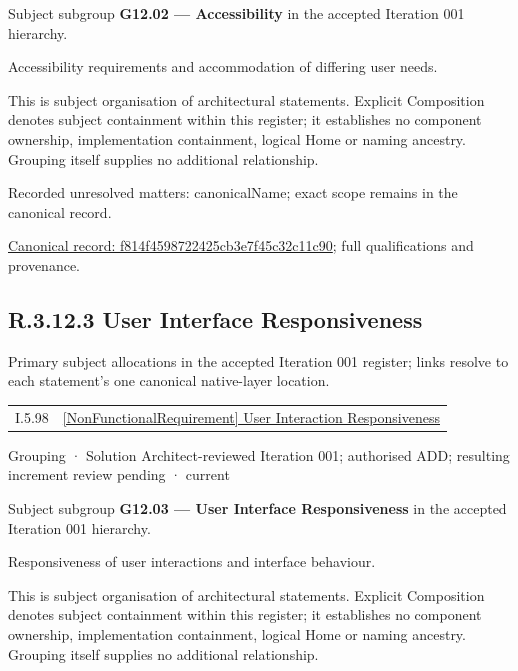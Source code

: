 Subject subgroup \textbf{G12.02 — Accessibility} in the accepted Iteration 001 hierarchy.



Accessibility requirements and accommodation of differing user needs.



This is subject organisation of architectural statements. Explicit Composition denotes subject containment within this register; it establishes no component ownership, implementation containment, logical Home or naming ancestry. Grouping itself supplies no additional relationship.


{\small Recorded unresolved matters: canonicalName; exact scope remains in the canonical record.}\par
{\footnotesize \href{../../../../continuum/grouping/f814f4598722425cb3e7f45c32c11c90.md}{Canonical record: f814f4598722425cb3e7f45c32c11c90}; full qualifications and provenance.}\par
\subsection*{R.3.12.3 User Interface Responsiveness}
\label{navigation:R.3.12.3}

Primary subject allocations in the accepted Iteration 001 register; links resolve to each statement’s one canonical native-layer location.\par
\begin{longtable}{p{.22\linewidth}p{.73\linewidth}}
I.5.98 & \hyperref[element:0f07f89a3a854bfdac4d4fc423feefca]{[NonFunctionalRequirement] User Interaction Responsiveness} \\
\end{longtable}
\label{element:1f441cdb8fa342cca0afe5b3b65b368d}
{\small Grouping · Solution Architect-reviewed Iteration 001; authorised ADD; resulting increment review pending · current}\par

Subject subgroup \textbf{G12.03 — User Interface Responsiveness} in the accepted Iteration 001 hierarchy.



Responsiveness of user interactions and interface behaviour.



This is subject organisation of architectural statements. Explicit Composition denotes subject containment within this register; it establishes no component ownership, implementation containment, logical Home or naming ancestry. Grouping itself supplies no additional relationship.



